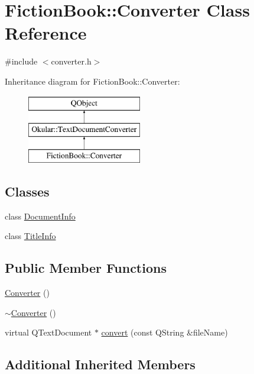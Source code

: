 \hypertarget{classFictionBook_1_1Converter}{\section{Fiction\+Book\+:\+:Converter Class Reference}
\label{classFictionBook_1_1Converter}
}


{\ttfamily \#include $<$converter.\+h$>$}

Inheritance diagram for Fiction\+Book\+:\+:Converter\+:\begin{figure}[H]
\begin{center}
\leavevmode
\includegraphics[height=3.000000cm]{classFictionBook_1_1Converter}
\end{center}
\end{figure}
\subsection*{Classes}
\begin{DoxyCompactItemize}
\item 
class \hyperlink{classConverter_1_1DocumentInfo}{Document\+Info}
\item 
class \hyperlink{classConverter_1_1TitleInfo}{Title\+Info}
\end{DoxyCompactItemize}
\subsection*{Public Member Functions}
\begin{DoxyCompactItemize}
\item 
\hyperlink{classFictionBook_1_1Converter_a1de81f3e06093411e5d27ce882bc010f}{Converter} ()
\item 
\hyperlink{classFictionBook_1_1Converter_a9ecd05695a52c03158b81e544e13b996}{$\sim$\+Converter} ()
\item 
virtual Q\+Text\+Document $\ast$ \hyperlink{classFictionBook_1_1Converter_aa63e543977130604de659a4d725ee8bd}{convert} (const Q\+String \&file\+Name)
\end{DoxyCompactItemize}
\subsection*{Additional Inherited Members}


